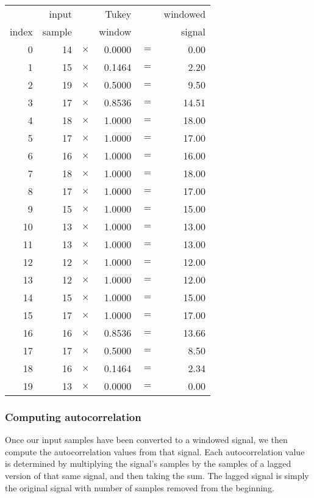 {
\begin{tabular}{|r|r >{$}c<{$} r >{$}c<{$} r|}
\hline
& input & & Tukey & & windowed \\
index & sample & & window & & signal \\
\hline
0 & 14 & \times & 0.0000 & = & 0.00 \\
1 & 15 & \times & 0.1464 & = & 2.20 \\
2 & 19 & \times & 0.5000 & = & 9.50 \\
3 & 17 & \times & 0.8536 & = & 14.51 \\
4 & 18 & \times & 1.0000 & = & 18.00 \\
5 & 17 & \times & 1.0000 & = & 17.00 \\
6 & 16 & \times & 1.0000 & = & 16.00 \\
7 & 18 & \times & 1.0000 & = & 18.00 \\
8 & 17 & \times & 1.0000 & = & 17.00 \\
9 & 15 & \times & 1.0000 & = & 15.00 \\
10 & 13 & \times & 1.0000 & = & 13.00 \\
11 & 13 & \times & 1.0000 & = & 13.00 \\
12 & 12 & \times & 1.0000 & = & 12.00 \\
13 & 12 & \times & 1.0000 & = & 12.00 \\
14 & 15 & \times & 1.0000 & = & 15.00 \\
15 & 17 & \times & 1.0000 & = & 17.00 \\
16 & 16 & \times & 0.8536 & = & 13.66 \\
17 & 17 & \times & 0.5000 & = & 8.50 \\
18 & 16 & \times & 0.1464 & = & 2.34 \\
19 & 13 & \times & 0.0000 & = & 0.00 \\
\hline
\end{tabular}
}

\subsubsection{Computing autocorrelation}

Once our input samples have been converted to a windowed signal,
we then compute the autocorrelation values from that signal.
Each autocorrelation value is determined by multiplying the signal's
samples by the samples of a lagged version of that same signal,
and then taking the sum.
The lagged signal is simply the original signal with  number of
samples removed from the beginning.

